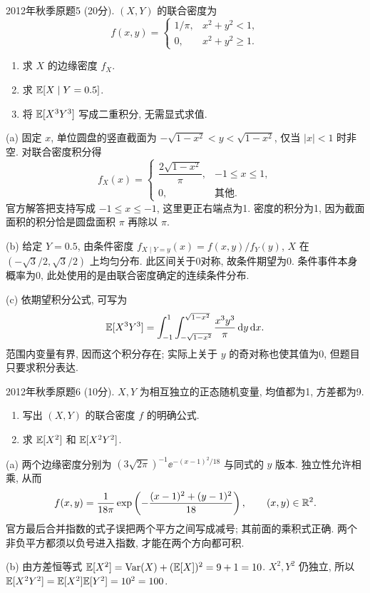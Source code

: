 \begin{exercise}\label{m2:2012f:q5}
2012年秋季原题5 (20分). $(X,Y)$ 的联合密度为
\[
f(x,y)=\begin{cases}1/\pi,&x^2+y^2<1,\\0,&x^2+y^2\ge1.\end{cases}
\]
\begin{enumerate}
\item[(a)]\label{m2:2012f:q5:a} 求 $X$ 的边缘密度 $f_X$.
\item[(b)]\label{m2:2012f:q5:b} 求 $\mathbb E[X\mid Y=0.5]$.
\item[(c)]\label{m2:2012f:q5:c} 将 $\mathbb E[X^3Y^3]$ 写成二重积分, 无需显式求值.
\end{enumerate}
\end{exercise}
\begin{solution}
(a) 固定 $x$, 单位圆盘的竖直截面为 $-\sqrt{1-x^2}<y<\sqrt{1-x^2}$, 仅当 $|x|<1$ 时非空. 对联合密度积分得
\[
f_X(x)=\begin{cases}\dfrac{2\sqrt{1-x^2}}\pi,&-1\le x\le1,\\0,&\text{其他}.\end{cases}
\]
官方解答把支持写成 $-1\le x\le-1$, 这里更正右端点为1. 密度的积分为1, 因为截面面积的积分恰是圆盘面积 $\pi$ 再除以 $\pi$.

(b) 给定 $Y=0.5$, 由条件密度 $f_{X\mid Y=y}(x)=f(x,y)/f_Y(y)$, $X$ 在 $(-\sqrt{3}/2,\sqrt{3}/2)$ 上均匀分布. 此区间关于0对称, 故条件期望为0. 条件事件本身概率为0, 此处使用的是由联合密度确定的连续条件分布.

(c) 依期望积分公式, 可写为
\[
\mathbb E[X^3Y^3]=\int_{-1}^1\int_{-\sqrt{1-x^2}}^{\sqrt{1-x^2}}\frac{x^3y^3}{\pi}\,\mathrm d y\,\mathrm d x.
\]
范围内变量有界, 因而这个积分存在; 实际上关于 $y$ 的奇对称也使其值为0, 但题目只要求积分表达.
\end{solution}

\begin{exercise}\label{m2:2012f:q6}
2012年秋季原题6 (10分). $X,Y$ 为相互独立的正态随机变量, 均值都为1, 方差都为9.
\begin{enumerate}
\item[(a)]\label{m2:2012f:q6:a} 写出 $(X,Y)$ 的联合密度 $f$ 的明确公式.
\item[(b)]\label{m2:2012f:q6:b} 求 $\mathbb E[X^2]$ 和 $\mathbb E[X^2Y^2]$.
\end{enumerate}
\end{exercise}
\begin{solution}
(a) 两个边缘密度分别为 $(3\sqrt{2\pi})^{-1}\ee^{-(x-1)^2/18}$ 与同式的 $y$ 版本. 独立性允许相乘, 从而
\[
f(x,y)=\frac1{18\pi}\exp\left(-\frac{(x-1)^2+(y-1)^2}{18}\right),\qquad(x,y)\in\mathbb R^2.
\]
官方最后合并指数的式子误把两个平方之间写成减号; 其前面的乘积式正确. 两个非负平方都须以负号进入指数, 才能在两个方向都可积.

(b) 由方差恒等式 $\mathbb E[X^2]=\operatorname{Var}(X)+(\mathbb E[X])^2=9+1=10$. $X^2,Y^2$ 仍独立, 所以 $\mathbb E[X^2Y^2]=\mathbb E[X^2]\mathbb E[Y^2]=10^2=100$.
\end{solution}

